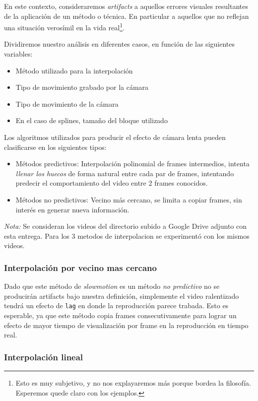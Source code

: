 En este contexto, consideraremos \emph{artifacts} a aquellos errores visuales resultantes de la aplicaci\'on de un m\'etodo o t\'ecnica. En particular a aquellos que no reflejan una situación verosímil en la vida real\footnote{Esto es muy subjetivo, y no nos explayaremos más porque bordea la filosofía. Esperemos quede claro con los ejemplos.}.

Dividiremos nuestro análisis en diferentes casos, en función de las siguientes variables:
\begin{itemize}
	\item Método utilizado para la interpolación
	\item Tipo de movimiento grabado por la cámara
	\item Tipo de movimiento de la cámara
	\item En el caso de splines, tamaño del bloque utilizado
\end{itemize}

Los algoritmos utilizados para producir el efecto de cámara lenta pueden clasificarse en los siguientes tipos:
\begin{itemize}
	\item Métodos predictivos: Interpolación polinomial de frames intermedios, intenta \emph{llenar los huecos} de forma natural entre cada par de frames, intentando predecir el comportamiento del video entre 2 frames conocidos.
	\item Métodos no predictivos: Vecino más cercano, se limita a copiar frames, sin interés en generar nueva información.
\end{itemize}

\emph{Nota:} Se consideran los videos del directorio subido a Google Drive adjunto con esta entrega. Para los 3 metodos de interpolacion se experimentó con los mismos videos.

\subsubsection{\bf{Interpolación por vecino mas cercano}}
Dado que este método de \emph{slowmotion} es un método \emph{no predictivo} no se producirán artifacts bajo nuestra definición, simplemente el video ralentizado tendrá un efecto de \texttt{lag} en donde la reproducción parece trabada. Esto es esperable, ya que este método copia frames consecutivamente para lograr un efecto de mayor tiempo de visualización por frame en la reproducción en tiempo real. 

\subsubsection{\bf{Interpolación lineal}}
